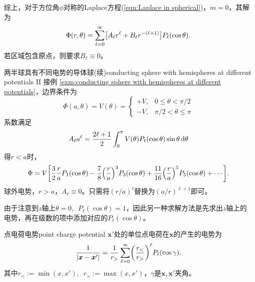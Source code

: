 综上，对于方位角$\phi$对称的Laplace方程(\ref{eqn:Laplace in spherical})，$m=0$，其解为
\begin{equation}
    \label{eqn:Phi(r, theta)}
    \Phi(r,\theta)=\sum_{\ell=0}^{\infty}\bigl[A_\ell r^\ell+B_\ell r^{-(\ell+1)}\bigr]P_\ell(\cos\theta).
\end{equation}
若区域包含原点，则要求$B_\ell\equiv 0$。
\begin{example}{两半球具有不同电势的导体球(续)}{conducting sphere with hemispheres at different potentials II}
    接例 \ref{exm:conducting sphere with hemispheres at different potentials}，边界条件为
    \[
        \Phi(a,\theta)=V(\theta)=
        \begin{cases}
            +V,&0\leqslant\theta<\pi/2\\
            -V,&\pi/2<\theta\leqslant\pi
        \end{cases}
    \]
    系数满足
    \[
        A_\ell a^\ell=\frac{2\ell+1}2\int_0^\pi V(\theta)P_\ell(\cos\theta)\sin\theta\mathop{}\!\mathrm{d}\theta
    \]
    得$r<a$时，
    \[
        \Phi=V\biggl[\frac32\frac raP_1(\cos\theta)-\frac78\Bigl(\frac ra\Bigr)^3P_3(\cos\theta)+\frac{11}{16}\Bigl(\frac ra\Bigr)^5P_5(\cos\theta)+\cdots\biggr].
    \]
    \tcblower
    球外电势，$r>a$，$A_\ell\equiv 0$。只需将$(r/a)^\ell$替换为$(a/r)^{\ell+1}$即可。
\end{example}
由于注意到$z$轴上$\theta=0,\enspace P_\ell(\cos\theta)=1$，因此另一种求解方法是先求出$z$轴上的电势，再在级数的项中添加对应的$P_\ell(\cos\theta)$。
\begin{example}{点电荷电势}{point charge potential}
    $\bm x'$处的单位点电荷在$\bm x$的产生的电势为
    \begin{equation}
        \label{eqn:1/|x-x'|}
        \frac1{|\bm x-\bm x'|}=\frac1{r_>}\sum_{\ell=0}^{\infty}\biggl(\frac{r_<}{r_>}\biggr)^\ell P_\ell(\cos\gamma).
    \end{equation}
    其中$r_<:=\min(x,x'),\enspace r_>:=\max(x,x')$，$\gamma$是$\bm x,\bm x'$夹角。
\end{example}
